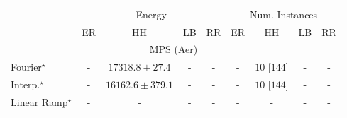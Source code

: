 \begin{tabular}{l|cccc|cccc|}
\toprule
& \multicolumn{4}{c|}{Energy} & \multicolumn{4}{c|}{Num. Instances} \\
            & ER & HH & LB & RR & ER & HH & LB & RR \\
\midrule
\multicolumn{9}{c}{\rule{0pt}{8pt}MPS (Aer)} \\
\midrule
Fourier$^\star$ & {\cellcolor[HTML]{000000}} \color[HTML]{F1F1F1} {\cellcolor{white}} \color{black} - & {\cellcolor[HTML]{4D004B}} \color[HTML]{F1F1F1} $17318.8\pm 27.4$ & {\cellcolor[HTML]{000000}} \color[HTML]{F1F1F1} {\cellcolor{white}} \color{black} - & {\cellcolor[HTML]{000000}} \color[HTML]{F1F1F1} {\cellcolor{white}} \color{black} - & {\cellcolor[HTML]{000000}} \color[HTML]{F1F1F1} {\cellcolor{white}} \color{black} - & {\cellcolor[HTML]{49006A}} \color[HTML]{F1F1F1} $10$ [$144$] & {\cellcolor[HTML]{000000}} \color[HTML]{F1F1F1} {\cellcolor{white}} \color{black} - & {\cellcolor[HTML]{000000}} \color[HTML]{F1F1F1} {\cellcolor{white}} \color{black} - \\
Interp.$^\star$ & {\cellcolor[HTML]{000000}} \color[HTML]{F1F1F1} {\cellcolor{white}} \color{black} - & {\cellcolor[HTML]{F7FCFD}} \color[HTML]{000000} $16162.6\pm 379.1$ & {\cellcolor[HTML]{000000}} \color[HTML]{F1F1F1} {\cellcolor{white}} \color{black} - & {\cellcolor[HTML]{000000}} \color[HTML]{F1F1F1} {\cellcolor{white}} \color{black} - & {\cellcolor[HTML]{000000}} \color[HTML]{F1F1F1} {\cellcolor{white}} \color{black} - & {\cellcolor[HTML]{49006A}} \color[HTML]{F1F1F1} $10$ [$144$] & {\cellcolor[HTML]{000000}} \color[HTML]{F1F1F1} {\cellcolor{white}} \color{black} - & {\cellcolor[HTML]{000000}} \color[HTML]{F1F1F1} {\cellcolor{white}} \color{black} - \\
Linear Ramp$^\star$ & {\cellcolor[HTML]{000000}} \color[HTML]{F1F1F1} {\cellcolor{white}} \color{black} - & {\cellcolor[HTML]{000000}} \color[HTML]{F1F1F1} {\cellcolor{white}} \color{black} - & {\cellcolor[HTML]{000000}} \color[HTML]{F1F1F1} {\cellcolor{white}} \color{black} - & {\cellcolor[HTML]{000000}} \color[HTML]{F1F1F1} {\cellcolor{white}} \color{black} - & {\cellcolor[HTML]{000000}} \color[HTML]{F1F1F1} {\cellcolor{white}} \color{black} - & {\cellcolor[HTML]{000000}} \color[HTML]{F1F1F1} {\cellcolor{white}} \color{black} - & {\cellcolor[HTML]{000000}} \color[HTML]{F1F1F1} {\cellcolor{white}} \color{black} - & {\cellcolor[HTML]{000000}} \color[HTML]{F1F1F1} {\cellcolor{white}} \color{black} - \\

\end{tabular}
